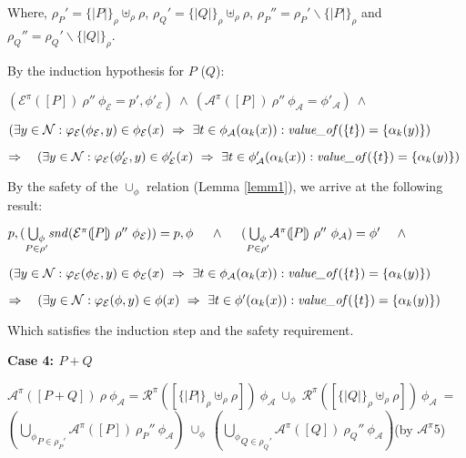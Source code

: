 \documentclass[10pt,a4paper,final,oneside,fleqn]{book}
\begin{document}
\noindent
Where, $\rho_P'=\{\!|P|\!\}_\rho\uplus_\rho\rho$, $\rho_Q'=\{\!|Q|\!\}_\rho\uplus_\rho\rho$, $\rho_P''=\rho_P'\backslash\{\!|P|\!\}_\rho$ and $\rho_Q''=\rho_Q'\backslash\{\!|Q|\!\}_\rho$.\vspace{5mm}

\noindent
By the induction hypothesis for $P$ ($Q$):

\noindent
$(\mathcal{E}^\pi(\![P]\!)~\rho''~\phi_{\mathcal{E}}=p',\phi'_\mathcal{E})~\wedge~(\mathcal{A}^\pi(\![P]\!)~\rho''~\phi_{\mathcal{A}}=\phi'_\mathcal{A})~\wedge$

\noindent
$(\exists y\in\mathcal{N}:\varphi_\mathcal{E}(\phi_\mathcal{E},y)\in\phi_\mathcal{E}(x)~\Rightarrow~\exists t\in\phi_\mathcal{A}(\alpha_k(x)):\mbox{{\itshape value\_of\/}}(\{t\})=\{\alpha_k(y)\})$\vspace{5mm}

\noindent
$\Rightarrow~~~(\exists y\in\mathcal{N}:\varphi_\mathcal{E}(\phi'_\mathcal{E},y)\in\phi'_\mathcal{E}(x)~\Rightarrow~\exists t\in\phi'_\mathcal{A}(\alpha_k(x)):\mbox{{\itshape value\_of\/}}(\{t\})=\{\alpha_k(y)\})$\vspace{5mm}

\noindent
By the safety of the $\cup_\phi$ relation (Lemma \ref{lemm1}), we arrive at the following result:

\noindent
$p,(\underset{P\in\rho'}{\bigcup_\phi}\mbox{{\itshape snd\/}}(\mathcal{E}^\pi(\![P]\!)~\rho''~\phi_{\mathcal{E}}))=p,\phi~~~~\wedge~~~~(\underset{P\in\rho'}{\bigcup_\phi}\mathcal{A}^\pi(\![P]\!)~\rho''~\phi_{\mathcal{A}})=\phi'~~~~\wedge\vspace{3mm}$

\noindent
$(\exists y\in\mathcal{N}:\varphi_\mathcal{E}(\phi_\mathcal{E},y)\in\phi_\mathcal{E}(x)~\Rightarrow~\exists t\in\phi_\mathcal{A}(\alpha_k(x)):\mbox{{\itshape value\_of\/}}(\{t\})=\{\alpha_k(y)\})$\vspace{5mm}

\noindent
$\Rightarrow~~~(\exists y\in\mathcal{N}:\varphi_\mathcal{E}(\phi,y)\in\phi(x)~\Rightarrow~\exists t\in\phi'(\alpha_k(x)):\mbox{{\itshape value\_of\/}}(\{t\})=\{\alpha_k(y)\})$\vspace{5mm}

\noindent
Which satisfies the induction step and the safety requirement.\vspace{5mm}

\noindent
{\bf Case 4: $P+Q$}

\noindent
$\mathcal{A}^\pi(\![P+Q]\!)~\rho~\phi_\mathcal{A}={\mathcal R}^\pi(\![\{\!|P|\!\}_\rho\uplus_\rho\rho]\!)~\phi_\mathcal{A}~\cup_\phi~{\mathcal R}^\pi(\![\{\!|Q|\!\}_\rho\uplus_\rho\rho]\!)~\phi_\mathcal{A}~=$\\$(\underset{P\in\rho_P'}{\bigcup_\phi}\mathcal{A}^\pi(\![P]\!)~\rho_P''~\phi_\mathcal{A})~\cup_\phi~(\underset{Q\in\rho_Q'}{\bigcup_\phi}\mathcal{A}^\pi(\![Q]\!)~\rho_Q''~\phi_\mathcal{A})$\hfill(by $\mathcal{A}^{\pi}5$)\vspace{5mm}
\end{document}
